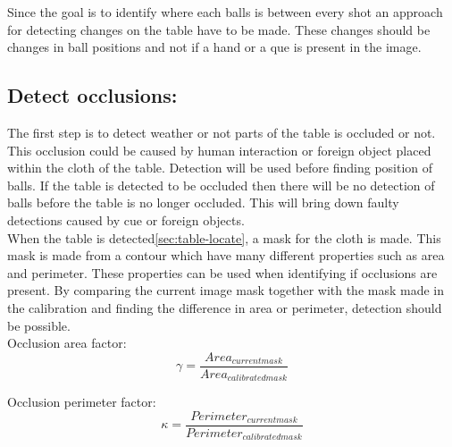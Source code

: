 Since the goal is to identify where each balls is between every shot an approach for detecting changes on the table have to be made. These changes should be changes in ball positions and not if a hand or a que is present in the image.\\

\subsection{Detect occlusions:}
The first step is to detect weather or not parts of the table is occluded or not. This occlusion could be caused by human interaction or foreign object placed within the cloth of the table. Detection will be used before finding position of balls. If the table is detected to be occluded then there will be no detection of balls before the table is no longer occluded. This will bring down faulty detections caused by cue or foreign objects.\\

When the table is detected\ref{sec:table-locate}, a mask for the cloth is made. This mask is made from a contour which have many different properties such as area and perimeter. These properties can be used when identifying if occlusions are present. By comparing the current image mask together with the mask made in the calibration and finding the difference in area or perimeter, detection should be possible.\\

Occlusion area factor:
\begin{equation}
\gamma = \frac{Area_{current mask}}{Area_{calibrated mask}}
\label{eq:area}
\end{equation}

Occlusion perimeter factor:
\begin{equation}
\kappa = \frac{Perimeter_{current mask}}{Perimeter_{calibrated mask}}
\label{eq:perimeter}
\end{equation}

